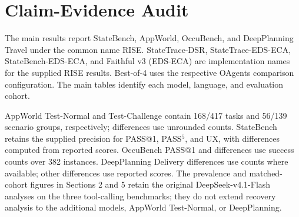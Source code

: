 \documentclass{article}
\begin{document}
\section{Claim-Evidence Audit}
\label{app:evidence}
The main results report StateBench, AppWorld, OccuBench, and DeepPlanning Travel under the common name RISE. StateTrace-DSR, StateTrace-EDS-ECA, StateBench-EDS-ECA, and Faithful v3 (EDS-ECA) are implementation names for the supplied RISE results. Best-of-4 uses the respective OAgents comparison configuration. The main tables identify each model, language, and evaluation cohort.

AppWorld Test-Normal and Test-Challenge contain 168/417 tasks and 56/139 scenario groups, respectively; differences use unrounded counts. StateBench retains the supplied precision for PASS@1, PASS$^5$, and UX, with differences computed from reported scores. OccuBench PASS@1 and differences use success counts over 382 instances. DeepPlanning Delivery differences use counts where available; other differences use reported scores. The prevalence and matched-cohort figures in Sections 2 and 5 retain the original DeepSeek-v4.1-Flash analyses on the three tool-calling benchmarks; they do not extend recovery analysis to the additional models, AppWorld Test-Normal, or DeepPlanning.
\end{document}
